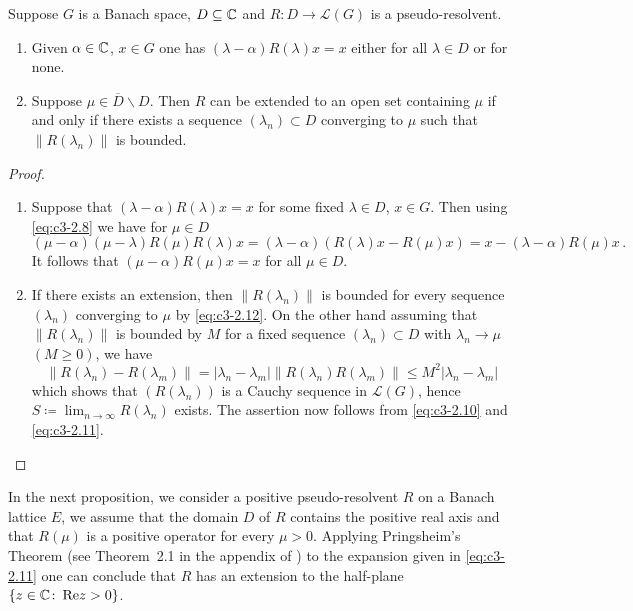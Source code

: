 \begin{proposition}\label{prop:c3-2.6}
	Suppose $G$ is a Banach space, $D \subseteq \mathbb{C} $ and $R \colon D \to \mathcal{L}(G)$ is a pseudo-resolvent.
	
	\begin{enumerate}[\upshape (i)]
		\item Given $\alpha \in \mathbb{C} $, $x \in G$ one has $(\lambda-\alpha)R(\lambda)x = x$ either for all $\lambda \in D$ or for none.
		
		\item Suppose $\mu \in \overline{D}\backslash D$. Then $R$ can be extended to an open set containing $\mu$ if and only if there exists a sequence $(\lambda_{n}) \subset D$ converging to $\mu$ such that $\|R(\lambda_{n})\|$ is bounded.
	\end{enumerate}
\end{proposition}
\begin{proof}
	\begin{enumerate}[\upshape (i), wide, labelindent=.5em]
		\item 
        Suppose that $(\lambda-\alpha)R(\lambda)x = x$ for some fixed $\lambda \in D$, $x \in G$.
		Then using \eqref{eq:c3-2.8} we have for $\mu \in D$ 
        \[
        (\mu-\alpha)(\mu-\lambda)R(\mu)R(\lambda)x = (\lambda-\alpha)(R(\lambda)x - R(\mu)x) = x - (\lambda-\alpha)R(\mu)x\,.
        \]
		It follows that $(\mu-\alpha)R(\mu)x = x$ for all $\mu \in D$.
		
		\item 
        If there exists an extension, then $\|R(\lambda_{n})\|$ is bounded for every sequence $(\lambda_{n})$ converging to $\mu$ by \eqref{eq:c3-2.12}.
		On the other hand assuming that $\|R(\lambda_{n})\|$ is bounded by $M$ for a fixed sequence $(\lambda_{n}) \subset D$ with $\lambda_{n} \to \mu$ $(M \geq 0)$, we have
		\[
		\|R(\lambda_{n}) - R(\lambda_{m})\| = |\lambda_{n}-\lambda_{m}| \|R(\lambda_{n})R(\lambda_{m})\| \leq M^2|\lambda_{n}-\lambda_{m}|
        \]
        which shows that $(R(\lambda_{n}))$ is a Cauchy sequence in $\mathcal{L}(G)$, hence $S \coloneq \lim_{n\to\infty}R(\lambda_{n})$ exists.
		The assertion now follows from \eqref{eq:c3-2.10} and \eqref{eq:c3-2.11}.
	\end{enumerate}
\end{proof}
In the next proposition, we consider a positive pseudo-resolvent $R$ on a Banach lattice $E$, \ie  we assume that the domain $D$ of $R$ contains the positive real axis and that $R(\mu)$ is a positive operator for every $\mu > 0$.
Applying Pringsheim's Theorem (see Theorem~2.1 in the appendix of \citet{schaefer:1966}) to the expansion given in \eqref{eq:c3-2.11} one can conclude that $R$ has an extension to the half-plane $\{z \in \mathbb{C}  \colon \mathop{}\!\mathrm{Re}  z > 0\}$.

